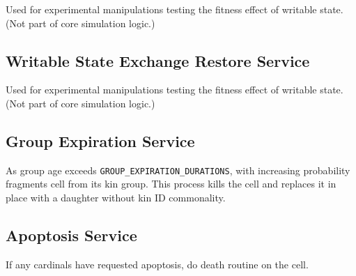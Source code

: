 
Used for experimental manipulations testing the fitness effect of writable state.
(Not part of core simulation logic.)

\subsection{Writable State Exchange Restore Service}


Used for experimental manipulations testing the fitness effect of writable state.
(Not part of core simulation logic.)

\subsection{Group Expiration Service}


As group age exceeds \texttt{GROUP\_EXPIRATION\_DURATIONS}, with increasing probability fragments cell from its kin group.
This process kills the cell and replaces it in place with a daughter without kin ID commonality.

\subsection{Apoptosis Service}


If any cardinals have requested apoptosis, do death routine on the cell.